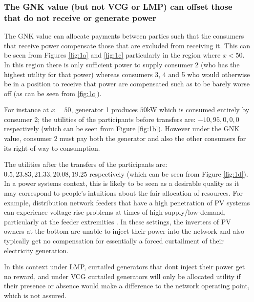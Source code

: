 
\subsubsection*{The GNK value (but not VCG or LMP) can offset those that do not receive or generate power}
The GNK value can allocate payments between parties such that the consumers that receive power compensate those that are excluded from receiving it.
This can be seen from Figures \ref{fig:1a} and \ref{fig:1c} particularly in the region where $x<50$.
In this region there is only sufficient power to supply consumer 2 (who has the highest utility for that power) whereas consumers 3, 4 and 5 who would otherwise be in a position to receive that power are
compensated such as to be barely worse off (as can be seen from \ref{fig:1c}).

For instance at $x=50$, generator 1 produces $50$kW which is consumed entirely by consumer 2; the utilities of the participants before transfers are: $-10, 95, 0, 0, 0$ respectively (which can be seen from Figure \ref{fig:1b}).
However under the GNK value, consumer 2 must pay both the generator and also the other consumers for its right-of-way to consumption.

The utilities after the transfers of the participants are: $0.5, 23.83, 21.33, 20.08, 19.25$ respectively (which can be seen from Figure \ref{fig:1d}).
In a power systems context, this is likely to be seen as a desirable quality as it may correspond to people's intuitions about the fair allocation of resources.
For example, distribution network feeders that have a high penetration of PV systems can experience voltage rise problems at 
times of high-supply/low-demand, particularly at the feeder extremities \cite{feeder1}. 
In these settings, the inverters of PV owners at the bottom are unable to inject their power into the network and also typically get no compensation for essentially a forced curtailment of their electricity generation.

In this context under LMP, curtailed generators that dont inject their power get no reward, and under VCG curtailed generators will only be allocated utility if their presence or absence would make a difference to the network operating point, which is not assured.

